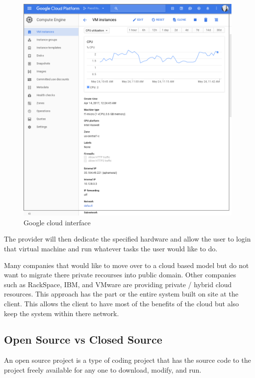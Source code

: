 \documentclass[12pt]{article}
\begin{document}
\begin{figure}
    \includegraphics[scale=.2]{./pic/2017-05-24-114324_946x962_scrot.png}
    \caption{Google cloud interface}
\end{figure}

The provider will then dedicate the specified hardware and allow the user to login that virtual machine and run whatever tasks the user would like to do.

Many companies that would like to move over to a cloud based model but do not want to migrate there private recourses into public domain. Other companies such as RackSpace, IBM, and VMware are providing private / hybrid cloud resources. This approach has the part or the entire system built on site at the client. This allows the client to have most of the benefits of the cloud but also keep the system within there network.

\subsection{Open Source vs Closed Source}
An open source project is a type of coding project that has the source code to the project freely available for any one to download, modify, and run.
\end{document}
